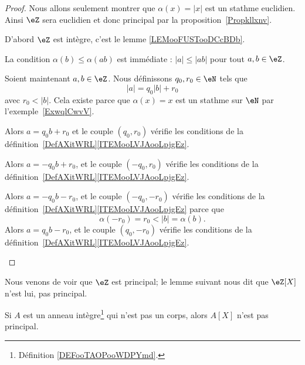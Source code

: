 \begin{proof}
	Nous allons seulement montrer que \( \alpha(x)=| x |\) est un stathme euclidien. Ainsi \( \eZ\) sera euclidien et donc principal par la proposition~\ref{Propkllxnv}.

	D'abord \( \eZ\) est intègre, c'est le lemme \ref{LEMooFUSTooDCcBDb}.

	La condition \( \alpha(b)\leq \alpha(ab)\) est immédiate : \( | a |\leq | ab |\) pour tout \( a,b\in \eZ\).

	Soient maintenant \( a,b\in \eZ\). Nous définissons \( q_0,r_0\in \eN\) tels que
	\begin{equation}
		| a |=q_0| b |+r_0
	\end{equation}
	avec \( r_0<| b |\). Cela existe parce que \( \alpha(x)=x\) est un stathme sur \( \eN\) par l'exemple~\ref{ExwqlCwvV}.

	\begin{subproof}
		\spitem[Si \( a>0\) et \( b>0\)]

		Alors \( a=q_0b+r_0\) et le couple \( (q_0,r_0)\) vérifie les conditions de la définition~\ref{DefAXitWRL}\ref{ITEMooLVJAooLpjgEz}.

		\spitem[Si \( a>0\) et \( b<0\)]

		Alors \( a=-q_0b+r_0\), et le couple \( (-q_0,r_0)\) vérifie les conditions de la définition~\ref{DefAXitWRL}\ref{ITEMooLVJAooLpjgEz}.


		\spitem[Si \( a<0\) et \( b>0\)]
		Alors \( a=-q_0b-r_0\), et le couple \( (-q_0,-r_0)\) vérifie les conditions de la définition~\ref{DefAXitWRL}\ref{ITEMooLVJAooLpjgEz} parce que
		\begin{equation}
			\alpha(-r_0)=r_0<| b |=\alpha(b).
		\end{equation}
		\spitem[Si \( a<0\) et \( b<0\)]
		Alors \( a=q_0b-r_0\), et le couple \( (q_0,-r_0)\) vérifie les conditions de la définition~\ref{DefAXitWRL}\ref{ITEMooLVJAooLpjgEz}.

	\end{subproof}
\end{proof}

Nous venons de voir que \( \eZ\) est principal; le lemme suivant nous dit que \( \eZ[X]\) n'est lui, pas principal.
\begin{lemma}        \label{LEMooDJSUooJWyxCL}
	Si \( A\) est un anneau intègre\footnote{Définition \ref{DEFooTAOPooWDPYmd}.} qui n'est pas un corps, alors \( A[X]\) n'est pas principal.
\end{lemma}

